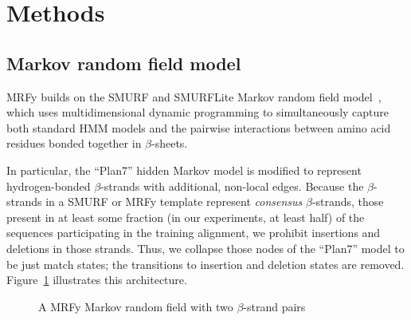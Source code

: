 \documentclass{acm_proc_article-sp}
\begin{document}
\section{Methods}

\subsection{Markov random field model}

MRFy builds on the SMURF and SMURFLite Markov random field 
model~\cite{Daniels:2012dg}, which uses multidimensional 
dynamic programming to simultaneously capture both standard HMM models and the
pairwise interactions between amino acid residues bonded together in
$\beta$-sheets. 

In particular, the ``Plan7'' hidden Markov model is modified to represent
hydrogen-bonded $\beta$-strands with additional, non-local edges.
Because the $\beta$-strands in a SMURF or MRFy template represent 
\emph{consensus} 
$\beta$-strands, those present in at least some fraction (in our experiments, 
at least
half) of the sequences participating in the training alignment, we prohibit
insertions and deletions in those strands.
Thus, we collapse those nodes of the ``Plan7'' model to be just match states;
the transitions to insertion and deletion states are removed.
Figure~\ref{mrfy_model} illustrates this architecture.


\begin{figure}[htb!]
\begin{center}
   \caption{A MRFy Markov random field with two $\beta$-strand pairs}
   \label{mrfy_model}
 \end{center}
\end{figure}
\end{document}
